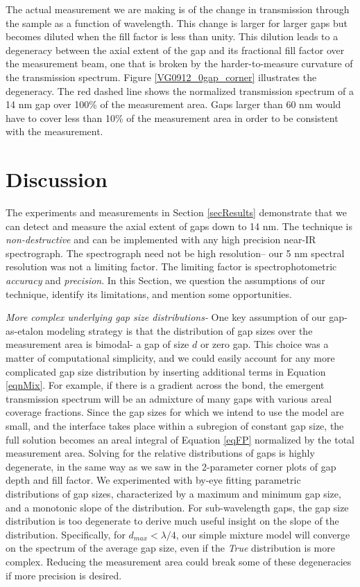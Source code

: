 \documentclass[osajnl,twocolumn,showpacs,superscriptaddress,11pt]{revtex4-1} %
\begin{document}
The actual measurement we are making is of the change in transmission through the sample as a function of wavelength.  This change is larger for larger gaps but becomes diluted when the fill factor is less than unity.  This dilution leads to a degeneracy between the axial extent of the gap and its fractional fill factor over the measurement beam,  one that is broken by the harder-to-measure curvature of the transmission spectrum.  Figure \ref{VG0912_0gap_corner} illustrates the degeneracy.  The red dashed line shows the normalized transmission spectrum of a 14 nm gap over 100\% of the measurement area.  Gaps larger than 60 nm would have to cover less than 10\% of the measurement area in order to be consistent with the measurement.


\section{Discussion}

The experiments and measurements in Section \ref{secResults} demonstrate that we can detect and measure the axial extent of gaps down to 14 nm.  The technique is \emph{non-destructive} and can be implemented with any high precision near-IR spectrograph.  The spectrograph need not be high resolution-- our 5 nm spectral resolution was not a limiting factor.  The limiting factor is spectrophotometric \emph{accuracy} and \emph{precision}.  In this Section, we question the assumptions of our technique, identify its limitations, and mention some opportunities.

\emph{More complex underlying gap size distributions-} One key assumption of our gap-as-etalon modeling strategy is that the distribution of gap sizes over the measurement area is bimodal- a gap of size $d$ or zero gap.  This choice was a matter of computational simplicity, and we could easily account for any more complicated gap size distribution by inserting additional terms in Equation \ref{eqnMix}.  For example, if there is a gradient across the bond, the emergent transmission spectrum will be an admixture of many gaps with various areal coverage fractions.  Since the gap sizes for which we intend to use the model are small, and the interface takes place within a subregion of constant gap size, the full solution becomes an areal integral of Equation \ref{eqFP} normalized by the total measurement area.  Solving for the relative distributions of gaps is highly degenerate, in the same way as we saw in the 2-parameter corner plots of gap depth and fill factor.  We experimented with by-eye fitting parametric distributions of gap sizes, characterized by a maximum and minimum gap size, and a monotonic slope of the distribution.  For sub-wavelength gaps, the gap size distribution is too degenerate to derive much useful insight on the slope of the distribution.  Specifically, for $d_{max}<\lambda/4$, our simple mixture model will converge on the spectrum of the average gap size, even if the \emph{True} distribution is more complex.  Reducing the measurement area could break some of these degeneracies if more precision is desired.
\end{document}
